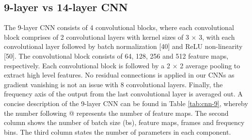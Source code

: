 \subsection{9-layer vs 14-layer CNN}
The 9-layer CNN consists of 4 convolutional blocks, where each convolutional block comprises of 2 convolutional layers with kernel sizes of 3 × 3, with each convolutional layer followed by batch normalization [40] and ReLU non-linearity [50]. The convolutional block consists of 64, 128, 256 and 512 feature maps, respectively. Each convolutional block is followed by a 2 × 2 average pooling to extract high level features. No residual connections is applied in our CNNs as gradient vanishing is not an issue with 8 convolutional layers. Finally, the frequency axis of the output from the last convolutional layer is averaged out. A concise description of the 9-layer CNN can be found in Table \ref{tab:cnn-9}, whereby the number following @ represents the number of feature maps. The second column shows the number of batch size (bs), feature maps, frames and frequency bins. The third column states the number of parameters in each component. 

